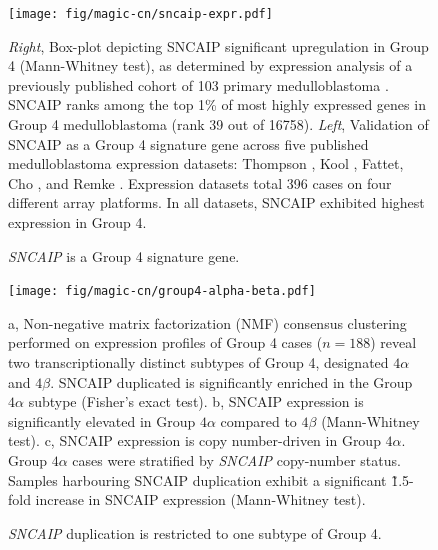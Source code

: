 \documentclass[11pt,letterpaper]{article}
\theoremstyle{definition}
\begin{document}

\begin{figure}[h]
	\begin{center}
		\texttt{[image: fig/magic-cn/sncaip-expr.pdf]}
	\end{center}
	\caption{\emph{SNCAIP} is a Group 4 signature gene.}
	\emph{Right}, Box-plot depicting SNCAIP significant upregulation in Group 4 (Mann-Whitney test), as determined by expression analysis of a previously published cohort of 103 primary medulloblastoma . SNCAIP ranks among the top 1\% of most highly expressed genes in Group 4 medulloblastoma (rank 39 out of 16758).
	\emph{Left}, Validation of SNCAIP as a Group 4 signature gene across five published medulloblastoma expression datasets: Thompson , Kool , Fattet, Cho , and Remke . Expression datasets total 396 cases on four different array platforms. In all datasets, SNCAIP exhibited highest expression in Group 4.
	\label{fig:sncaip-expr}
\end{figure}

\begin{figure}[h]
	\begin{center}
		\texttt{[image: fig/magic-cn/group4-alpha-beta.pdf]}
	\end{center}
	\caption{\emph{SNCAIP} duplication is restricted to one subtype of Group 4.}
	\textsf{a}, Non-negative matrix factorization (NMF) consensus clustering performed on expression profiles of Group 4 cases ($n = 188$) reveal two transcriptionally distinct subtypes of Group 4, designated $4\alpha$ and $4\beta$. SNCAIP duplicated is significantly enriched in the Group $4\alpha$ subtype (Fisher's exact test).
	\textsf{b}, SNCAIP expression is significantly elevated in Group $4\alpha$ compared to $4\beta$ (Mann-Whitney test).
	\textsf{c}, SNCAIP expression is copy number-driven in Group $4\alpha$. Group $4\alpha$ cases were stratified by \emph{SNCAIP} copy-number status. Samples harbouring SNCAIP duplication exhibit a significant \~1.5-fold increase in SNCAIP expression (Mann-Whitney test).
	\label{fig:group4-alpha-beta}
\end{figure}

\clearpage
\end{document}
